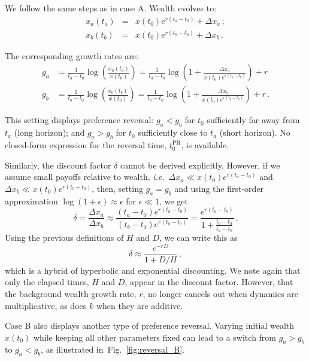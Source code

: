 \documentclass[11pt]{article}
\newcommand{\elabel}[1]{\label{eq:#1}}
\newcommand{\ie}{{\it i.e.}\ }
\newcommand{\fref}[1]{Fig.~\ref{fig:#1}}
\newcommand{\be}{\begin{equation}}
\newcommand{\ee}{\end{equation}}
\newcommand{\bea}{\begin{eqnarray}}
\newcommand{\eea}{\end{eqnarray}}
\newcommand{\Dx}{\Delta x}
\newcommand{\del}{D}
\newcommand{\hor}{H}
\numberwithin{equation}{section}
\begin{document}
We follow the same steps as in case A. Wealth evolves to:
\bea
x_a\left(t_a\right) &=& x\left(t_0\right) e^{r(t_a-t_0)} + \Dx_a\,;\\
x_b\left(t_b\right) &=& x\left(t_0\right) e^{r(t_b-t_0)} + \Dx_b\,.
\eea

The corresponding growth rates are:
\bea
g_a &= \frac{1}{t_a-t_0} \log{\left(\frac{x_a\left(t_a\right)}{x\left(t_0\right)}\right)} = \frac{1}{t_a-t_0}\log{\left(1 + \frac{\Dx_a}{x\left(t_0\right)e^{r(t_a-t_0)}}\right)} + r \elabel{ga_B}\\
g_b &= \frac{1}{t_b-t_0} \log{\left(\frac{x_b\left(t_b\right)}{x\left(t_0\right)}\right)} = \frac{1}{t_b-t_0}\log{\left(1 + \frac{\Dx_b}{x\left(t_0\right)e^{r(t_b-t_0)}}\right)} + r\,.\elabel{gb_B}
\eea

This setting displays preference reversal: $g_a<g_b$ for $t_0$ sufficiently far away from $t_a$ (long horizon); and $g_a>g_b$ for $t_0$ sufficiently close to $t_a$ (short horizon). No closed-form expression for the reversal time, $t_0^\text{PR}$, is available.

Similarly, the discount factor $\delta$ cannot be derived explicitly. However, if we assume small payoffs relative to wealth, \ie $\Dx_a \ll x\left(t_0\right)e^{r(t_a-t_0)}$ and $\Dx_b \ll x\left(t_0\right)e^{r(t_b-t_0)}$, then, setting $g_a=g_b$ and using the first-order approximation $\log(1+\epsilon)\approx\epsilon$ for $\epsilon\ll1$, we get
\be
\delta = \frac{\Dx_a}{\Dx_b} \approx \frac{(t_a-t_0)e^{r(t_a-t_0)}}{(t_b-t_0)e^{r(t_b-t_0)}} =
\frac{e^{r(t_a-t_b)}}{1+\frac{t_b-t_a}{t_a-t_0}}\,.
\ee
Using the previous definitions of $\hor$ and $\del$, we can write this as
\be
\delta \approx \frac{e^{-r\del}}{1+\del/\hor}\,,
\ee
which is a hybrid of hyperbolic and exponential discounting. We note again that only the elapsed times, $\hor$ and $\del$, appear in the discount factor. However, that the background wealth growth rate, $r$, no longer cancels out when dynamics are multiplicative, as does $k$ when they are additive.

Case B also displays another type of preference reversal. Varying initial wealth $x(t_0)$ while keeping all other parameters fixed can lead to a switch from $g_a>g_b$ to $g_a<g_b$, as illustrated in~\fref{reversal_B}.
\end{document}
